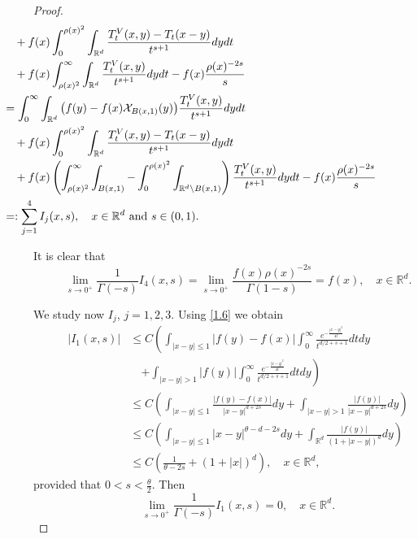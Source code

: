 \documentclass[10pt, a4paper, reqno]{amsart}
\theoremstyle{definition}
\theoremstyle{remark}
\numberwithin{equation}{section}
\begin{document}
\begin{proof}
\begin{align}
    &\hspace{-3cm}\quad +f(x)\int_0^{\rho (x)^2}\int_{\mathbb R^d}\frac{T_t^V(x,y)-T_t(x-y)}{t^{s+1}}dydt\nonumber\\
    &\hspace{-3cm}\quad +f(x) \int_{\rho (x)^2}^\infty\int_{\mathbb R^d}\frac{T_t^V(x,y)}{t^{s+1}}dydt-f(x)\frac{\rho (x)^{-2s}}{s}\nonumber\\
     &\hspace{-3cm}= \int_0^\infty\int_{\mathbb R^d}\big(f(y)-f(x)\mathcal X_{B(x,1)}(y)\big)\frac{T_t^V(x,y)}{t^{s+1}}dydt\nonumber\\
    &\hspace{-3cm}\quad +f(x)\int_0^{\rho (x)^2}\int_{\mathbb R^d}\frac{T_t^V(x,y)-T_t(x-y)}{t^{s+1}}dydt\nonumber\\
    &\hspace{-3cm}\quad +f(x)\left(\int_{\rho (x)^2}^\infty\int_{B(x,1)}-\int_0^{\rho (x)^2}\int_{\mathbb R^d\setminus B(x,1)} \right)\frac{T_t^V(x,y)}{t^{s+1}}dydt-f(x)\frac{\rho (x)^{-2s}}{s}\nonumber\\
&\hspace{-3cm}=:\sum_{j=1}^4I_j(x,s),\quad x\in \mathbb R^d\mbox{ and }s\in (0,1).
\end{align}

It is clear that 
\begin{equation}\label{limI4}
   \lim_{s\rightarrow 0^+}\frac{1}{\Gamma (-s)}I_4(x,s)=\lim_{s\rightarrow 0^+}\frac{f(x)\rho (x)^{-2s}}{\Gamma (1-s)}=f(x),\quad x\in \mathbb R^d. 
\end{equation}

We study now $I_j$, $j=1,2,3$. Using \eqref{1.6} we obtain
\begin{align*}
   |I_1(x,s)|&\leq C\left(\int_{|x-y|\leq 1}|f(y)-f(x)|\int_0^ \infty \frac{e^{-\frac{|x-y|^2}{4t}}}{t^{d/2+s+1}}dtdy\right.\nonumber\\
  &\quad \left.+\int_{|x-y|>1}|f(y)|\int_0^ \infty \frac{e^{-\frac{|x-y|^2}{4t}}}{t^{d/2+s+1}}dtdy\right)\\
  &\leq C\left(\int_{|x-y|\leq 1}\frac{|f(y)-f(x)|}{|x-y|^{d+2s}}dy+\int_{|x-y|>1}\frac{|f(y)|}{|x-y|^{d+2s}}dy\right)\\
  &\leq C\left(\int_{|x-y|\leq 1}|x-y|^{\theta -d-2s}dy+\int_{\mathbb R^d}\frac{|f(y)|}{(1+|x-y|)^d}dy\right)\\
  &\leq C\left(\frac{1}{\theta -2s}+(1+|x|)^d\right),\quad x\in \mathbb R^d,
\end{align*}
provided that $0<s<\tfrac{\theta}{2}$. Then
\begin{equation}\label{1.7}
\lim_{s\rightarrow 0^+}\frac{1}{\Gamma (-s)}I_1(x,s)=0,\quad x\in \mathbb R^d.
\end{equation}


\end{proof}
\end{document}
